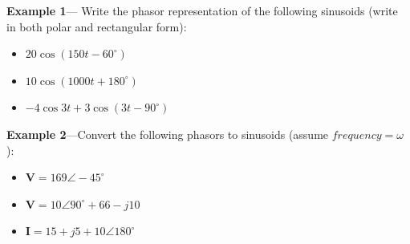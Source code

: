 \documentclass{handout}
\begin{document}
\newpage
\clearpage
\pagebreak

\textbf{Example 1}--- Write the phasor representation of the following sinusoids (write in both polar and rectangular form):
\begin{itemize}
\item $20\cos(150t-60^\circ)$
\item $10\cos(1000t+180^\circ)$
\item $-4\cos 3t + 3\cos(3t-90^\circ)$
\end{itemize}



\textbf{Example 2}---Convert the following phasors to sinusoids (assume $frequency = \omega$):
\begin{itemize}
\item $\mathbf{V} = 169 \angle -45^\circ$
\item $\mathbf{V} = 10 \angle 90^\circ + 66 -j10$
\item $\mathbf{I} = 15+j5+10\angle180^\circ$
\end{itemize}

\end{document}

